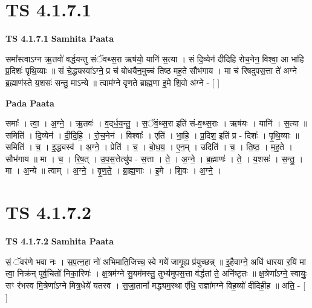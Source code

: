 \documentclass[17pt]{extarticle}
\begin{document}

\section{ TS 4.1.7.1 }

\textbf{TS 4.1.7.1 } \newline
\textbf{Samhita Paata} \newline

समा᳚स्त्वाऽग्न ऋ॒तवो॑ वर्द्धयन्तु संॅवथ्स॒रा ऋष॑यो॒ यानि॑ स॒त्या । सं दि॒व्येन॑ दीदिहि रोच॒नेन॒ विश्वा॒ आ भा॑हि प्र॒दिशः॑ पृथि॒व्याः ॥ सं चे॒द्ध्यस्वा᳚ऽग्ने॒ प्र च॑ बोधयैन॒मुच्च॑ तिष्ठ मह॒ते सौभ॑गाय । मा च॑ रिषदुपस॒त्ता ते॑ अग्ने ब्र॒ह्माण॑स्ते य॒शसः॑ सन्तु॒ माऽन्ये ॥ त्वाम॑ग्ने वृणते ब्राह्म॒णा इ॒मे शि॒वो अ॑ग्ने - [  ] \newline

\textbf{Pada Paata} \newline

समाः᳚ । त्वा॒ । अ॒ग्ने॒ । ऋ॒तवः॑ । व॒द्‌र्ध॒य॒न्तु॒ । स॒ॅवं॒थ्स॒रा इति॑ सं-व॒थ्स॒राः । ऋष॑यः । यानि॑ । स॒त्या ॥ समिति॑ । दि॒व्येन॑ । दी॒दि॒हि॒ । रो॒च॒नेन॑ । विश्वाः᳚ । एति॑ । भा॒हि॒ । प्र॒दिश॒ इति॑ प्र - दिशः॑ । पृ॒थि॒व्याः ॥ समिति॑ । च॒ । इ॒द्ध्यस्व॑ । अ॒ग्ने॒ । प्रेति॑ । च॒ । बो॒ध॒य॒ । ए॒न॒म् । उदिति॑ । च॒ । ति॒ष्ठ॒ । म॒ह॒ते । सौभ॑गाय ॥ मा । च॒ । रि॒ष॒त् । उ॒प॒स॒त्तेत्यु॑प - स॒त्ता । ते॒ । अ॒ग्ने॒ । ब्र॒ह्माणः॑ । ते॒ । य॒शसः॑ । स॒न्तु॒ । मा । अ॒न्ये ॥ त्वाम् । अ॒ग्ने॒ । वृ॒ण॒ते॒ । ब्रा॒ह्म॒णाः । इ॒मे । शि॒वः । अ॒ग्ने॒ ।  \newline





\section{ TS 4.1.7.2 }

\textbf{TS 4.1.7.2 } \newline
\textbf{Samhita Paata} \newline

सं॒ ॅवर॑णे भवा नः । स॒प॒त्न॒हा नो॑ अभिमाति॒जिच्च॒ स्वे गये॑ जागृ॒ह्य प्र॑युच्छन्न् ॥ इ॒हैवाग्ने॒ अधि॑ धारया र॒यिं मा त्वा॒ निक्र॑न् पूर्व॒चितो॑ निका॒रिणः॑ । क्ष॒त्रम॑ग्ने सु॒यम॑मस्तु॒ तुभ्य॑मुपस॒त्ता व॑र्द्धतां ते॒ अनि॑ष्टृतः ॥ क्ष॒त्रेणा᳚ऽग्ने॒ स्वायुः॒ सꣳ र॑भस्व मि॒त्रेणा᳚ऽग्ने मित्र॒धेये॑ यतस्व । स॒जा॒तानां᳚ मद्ध्यम॒स्था ए॑धि॒ राज्ञा॑मग्ने विह॒व्यो॑ दीदिही॒ह ॥ अति॒ - [  ] \newline
\end{document}
